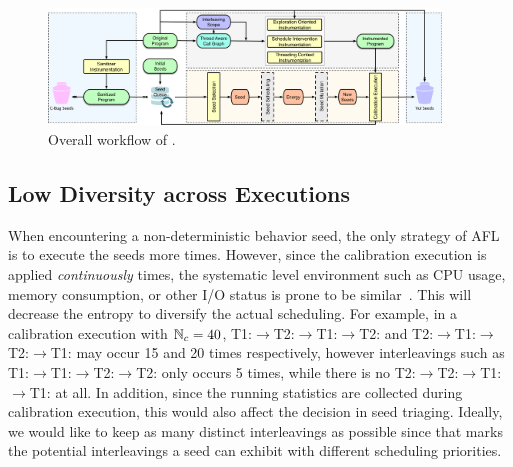 \begin{figure}[ht]
    \centering
    \includegraphics[width=0.93\textwidth]{res/mtfuzz/overview.pdf}
    \caption{Overall workflow of \mtfuzz.}
    \label{fig:workflow}
\end{figure} 
\subsection{Low Diversity across Executions}\label{sec:afl_issue_mt}
When encountering a non-deterministic behavior seed, the only strategy of AFL is to execute the seeds more times. However, since the calibration execution is applied \emph{continuously} \Ncal times, the systematic level environment such as CPU usage, memory consumption, or other I/O status is prone to be similar~\cite{posixstd,tlpi}. This will decrease the entropy to diversify the actual scheduling. For example, in a calibration execution with $\mathbb{N}_{c}=40$,  T1:$\rightarrow$T2:$\rightarrow$T1:$\rightarrow$T2: and T2:$\rightarrow$T1:$\rightarrow$T2:$\rightarrow$T1: may occur 15 and 20 times respectively, however interleavings such as T1:$\rightarrow$T1:$\rightarrow$T2:$\rightarrow$T2: only occurs 5 times, while there is no T2:$\rightarrow$T2:$\rightarrow$T1:$\rightarrow$T1: at all. In addition, since the running statistics are collected during calibration execution, this would also affect the decision in seed triaging. Ideally, we would like to keep as many distinct interleavings as possible since that marks the potential interleavings a seed can exhibit with different scheduling priorities.



